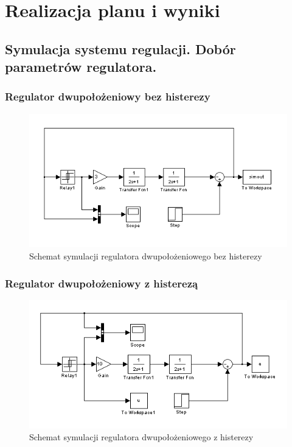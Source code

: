\documentclass[a4paper,10pt]{article}
\begin{document}
\newpage
\section{Realizacja planu i wyniki}
\subsection{Symulacja systemu regulacji. Dobór parametrów regulatora.}\label{sec:zad1}
\subsubsection{Regulator dwupołożeniowy bez histerezy}\label{sec:r2bh}
\begin{figure}[h]
    \centering
	\includegraphics[width=120mm]{CW3-schemat-2bez.png}
	\caption{Schemat symulacji regulatora dwupołożeniowego bez histerezy}
    \label{fig:Rysunek}
\end{figure}

\subsubsection{Regulator dwupołożeniowy z histerezą}\label{sec:r2h}
\begin{figure}[h]
    \centering
	\includegraphics[width=120mm]{CW3-schemat-2z.png}
	\caption{Schemat symulacji regulatora dwupołożeniowego z histerezy}
    \label{fig:Rysunek}
\end{figure}
\end{document}
